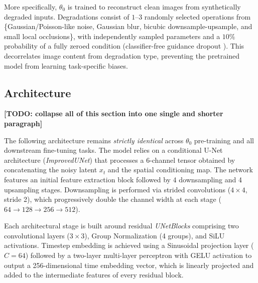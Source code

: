 \documentclass{article}
\newcommand{\todo}[1]{\textbf{\color{red}[TODO: #1]}}
\begin{document}
More specifically, $\theta_0$ is trained to reconstruct clean images from synthetically degraded inputs. Degradations consist of $1$--$3$ randomly selected operations from \{Gaussian/Poisson-like noise, Gaussian blur, bicubic downsample-upsample, and small local occlusions\}, with independently sampled parameters and a $10\%$ probability of a fully zeroed condition (classifier-free guidance dropout \cite{ho2022cfg}). This decorrelates image content from degradation type, preventing the pretrained model from learning task-specific biases.

\subsection{Architecture}

\todo{collapse all of this section into one single and shorter paragraph}

The following architecture remains \emph{strictly identical} across $\theta_0$ pre-training and all downstream fine-tuning tasks. The model relies on a conditional U-Net architecture (\emph{ImprovedUNet}) that processes a 6-channel tensor obtained by concatenating the noisy latent $x_t$ and the spatial conditioning map. The network features an initial feature extraction block followed by 4 downsampling and 4 upsampling stages. Downsampling is performed via strided convolutions ($4 \times 4$, stride 2), which progressively double the channel width at each stage ($64 \rightarrow 128 \rightarrow 256 \rightarrow 512$).

Each architectural stage is built around residual \emph{UNetBlocks} comprising two convolutional layers ($3 \times 3$), Group Normalization (4 groups), and SiLU activations. Timestep embedding is achieved using a Sinusoidal projection layer ($C=64$) followed by a two-layer multi-layer perceptron with GELU activation to output a 256-dimensional time embedding vector, which is linearly projected and added to the intermediate features of every residual block.
\end{document}
